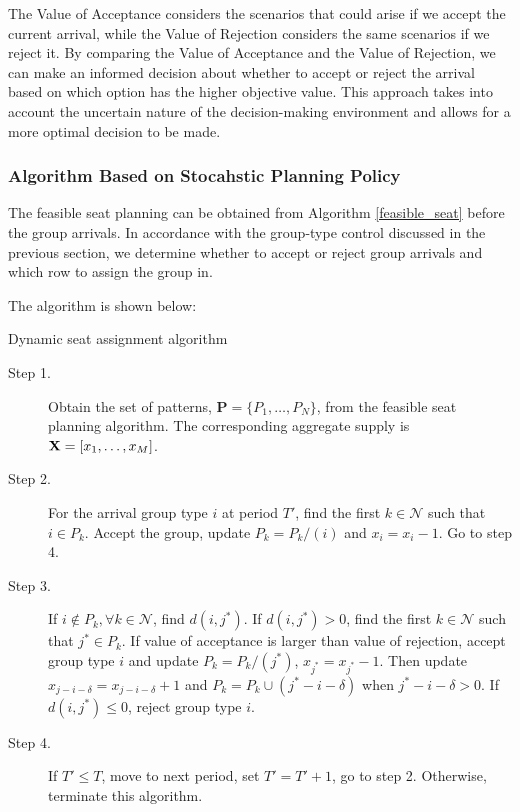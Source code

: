 The Value of Acceptance considers the scenarios that could arise if we accept the current arrival, while the Value of Rejection considers the same scenarios if we reject it. By comparing the Value of Acceptance and the Value of Rejection, we can make an informed decision about whether to accept or reject the arrival based on which option has the higher objective value. This approach takes into account the uncertain nature of the decision-making environment and allows for a more optimal decision to be made.

\subsubsection{Algorithm Based on Stocahstic Planning Policy}
The feasible seat planning can be obtained from Algorithm \ref{feasible_seat} before the group arrivals. In accordance with the group-type control discussed in the previous section, we determine whether to accept or reject group arrivals and which row to assign the group in.

The algorithm is shown below:

\begin{algorithm}[H]
  \caption{Dynamic seat assignment algorithm}\label{algo_dynamic_policy}
  \begin{description}
    \item[Step 1.] Obtain the set of patterns, $\mathbf{P} = \{P_1,\ldots,P_{N}\}$, from the feasible seat planning algorithm. The corresponding aggregate supply is $\mathbf{X} = [x_{1}, \ldots, x_{M}]$.
    \item[Step 2.] For the arrival group type $i$ at period $T{'}$, find the first $k \in \mathcal{N}$ such that $i \in P_k$. Accept the group, update $P_{k} = P_{k}/(i)$ and $x_{i} = x_{i} -1$. Go to step 4.
    \item[Step 3.] If $i \notin P_k, \forall k \in \mathcal{N}$, find $d(i,j^{*})$. If $d(i,j^{*})>0$, find the first $k \in \mathcal{N}$ such that $j^{*} \in P_k$. If value of acceptance is larger than value of rejection, accept group type $i$ and update $P_{k} = P_{k}/(j^{*})$, $x_{j^{*}} = x_{j^{*}} -1$. Then update $x_{j-i-\delta} = x_{j-i-\delta} + 1$ and $P_{k}= P_{k} \cup (j^{*}-i-\delta)$ when $j^{*}-i-\delta > 0$. If $d(i,j^{*}) \leq 0$, reject group type $i$.
    \item[Step 4.] If $T{'} \leq T$, move to next period, set $T{'} = T{'}+1$, go to step 2. Otherwise, terminate this algorithm.
  \end{description}
\end{algorithm}

